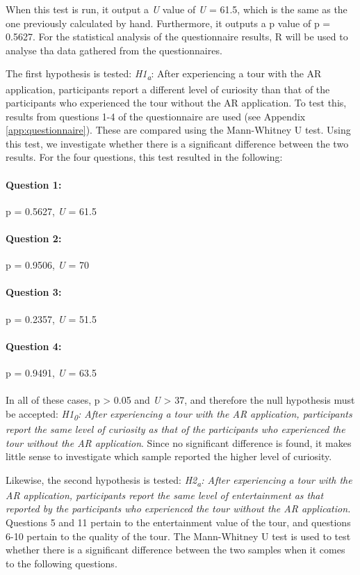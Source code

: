 When this test is run, it output a \textit{U} value of \textit{U} = 61.5, which is the same as the one previously calculated by hand. Furthermore, it outputs a p value of p = 0.5627. For the statistical analysis of the questionnaire results, R will be used to analyse tha data gathered from the questionnaires.
 
The first hypothesis is tested: \textit{H1\textsubscript{a}}: After experiencing a tour with the AR application, participants report a different level of curiosity than that of the participants who experienced the tour without the AR application. To test this, results from questions 1-4 of the questionnaire are used (see Appendix \ref{app:questionnaire}). These are compared using the Mann-Whitney U test. Using this test, we investigate whether there is a significant difference between the two results. For the four questions, this test resulted in the following:

\paragraph{Question 1:} p = 0.5627, \textit{U} = 61.5
\paragraph{Question 2:} p = 0.9506, \textit{U} = 70
\paragraph{Question 3:} p = 0.2357, \textit{U} = 51.5
\paragraph{Question 4:} p = 0.9491, \textit{U} = 63.5\\
\\
In all of these cases, p > 0.05 and \textit{U} > 37, and therefore the null hypothesis must be accepted: \textit{H1\textsubscript{0}: After experiencing a tour with the AR application, participants report the same level of curiosity as that of the participants who experienced the tour without the AR application}. Since no significant difference is found, it makes little sense to investigate which sample reported the higher level of curiosity.

Likewise, the second hypothesis is tested: \textit{H2\textsubscript{a}: After experiencing a tour with the AR application, participants report the same level of entertainment as that reported by the participants who experienced the tour without the AR application.} Questions 5 and 11 pertain to the entertainment value of the tour, and questions 6-10 pertain to the quality of the tour. The Mann-Whitney U test is used to test whether there is a significant difference between the two samples when it comes to the following questions.\pagebreak

